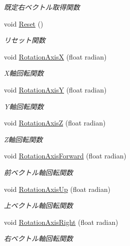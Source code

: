 \begin{DoxyCompactItemize}
\begin{DoxyCompactList}\small\item\em 既定右ベクトル取得関数 \end{DoxyCompactList}\item 
void \mbox{\hyperlink{class_axis_a2ccc5c19d05f0c9096c6a3e14af2de8f}{Reset}} ()
\begin{DoxyCompactList}\small\item\em リセット関数 \end{DoxyCompactList}\item 
void \mbox{\hyperlink{class_axis_a74c734b0145fe83813c139cc731b5bce}{Rotation\+AxisX}} (float radian)
\begin{DoxyCompactList}\small\item\em X軸回転関数 \end{DoxyCompactList}\item 
void \mbox{\hyperlink{class_axis_acb5217738982de2c3695ef0802b14a6c}{Rotation\+AxisY}} (float radian)
\begin{DoxyCompactList}\small\item\em Y軸回転関数 \end{DoxyCompactList}\item 
void \mbox{\hyperlink{class_axis_a1a0571e9a3e26843be14ff62f08351e3}{Rotation\+AxisZ}} (float radian)
\begin{DoxyCompactList}\small\item\em Z軸回転関数 \end{DoxyCompactList}\item 
void \mbox{\hyperlink{class_axis_af53def73117a3e373768d6c155af3103}{Rotation\+Axis\+Forward}} (float radian)
\begin{DoxyCompactList}\small\item\em 前ベクトル軸回転関数 \end{DoxyCompactList}\item 
void \mbox{\hyperlink{class_axis_a90411a040bb9673b5e0785a4da46c023}{Rotation\+Axis\+Up}} (float radian)
\begin{DoxyCompactList}\small\item\em 上ベクトル軸回転関数 \end{DoxyCompactList}\item 
void \mbox{\hyperlink{class_axis_aeb54b8fe54afaa79c930c64136f0007d}{Rotation\+Axis\+Right}} (float radian)
\begin{DoxyCompactList}\small\item\em 右ベクトル軸回転関数 \end{DoxyCompactList}\item 

\end{DoxyCompactItemize}
